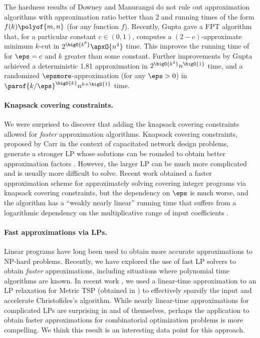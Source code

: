 \documentclass[11pt]{article}
\numberwithin{equation}{section}
\theoremstyle{definition}
\theoremstyle{plain}
\begin{document}
The hardness results of Downey \etal \cite{defpr-03} and Manurangsi
\cite{manurangsi-17} do not rule out approximation algorithms with
approximation ratio better than 2 and running times of the form
$f(k)\polyof{m,n}$ (for any function $f$). Recently, Gupta \etal \cite{gll-18} gave
a FPT algorithm that, for a particular constant $c \in (0,1)$,
computes a $(2 - c)$-approximate
minimum %
$k$-cut in
\begin{math}
  2^{\bigO{k^6}} \apxO{n^4}
\end{math}
time. This improves the running time of \cite{xcy-11} for $\eps = c$
and $k$ greater than some constant. Further improvements by
Gupta \etal \cite{gll-18-focs} achieved a deterministic 1.81 approximation in
$2^{\bigO{k^2}} n^{\bigO{1}}$ time, and a randomized
$\epsmore$-approximation (for any $\eps > 0$) in
$\parof{k / \eps}^{\bigO{k}} n^{k + \bigO{1}}$ time.

\paragraph{Knapsack covering constraints.}
We were surprised to discover that adding the knapsack covering
constraints allowed for \emph{faster} approximation
algorithms. Knapsack covering constraints, proposed by Carr \etal
\cite{cflp-00} in the context of capacitated network design problems,
generate a stronger LP whose solutions can be rounded to obtain better
approximation factors %
\cite{cflp-00,cckk-15,ky-05}.   %
However, the
larger LP can be much more complicated and is usually more difficult
to solve. Recent work obtained a faster approximation scheme for
%
approximately solving %
 covering integer programs via knapsack covering
constraints, but the dependency on $\eps$ is much worse, and the
algorithm has a ``weakly nearly linear'' running time that suffers
from a logarithmic dependency on the multiplicative range of input
coefficients \cite{cq-19}.

\paragraph{Fast approximations via LPs.}
Linear programs have long been used to obtain more accurate
approximations to %
NP-hard  %
problems. Recently, we have explored the use
of fast LP solvers to obtain \emph{faster} approximations, including
situations where polynomial time algorithms are known. In recent work
\cite{cq-18-christofides}, we used a %
linear-time  %
approximation to an
LP relaxation for Metric TSP (obtained in \cite{cq-17-focs}) to
effectively sparsify the input and accelerate
%
Christofides's
algorithm. While nearly %
linear-time  %
approximations for complicated
LPs are surprising in and of %
themselves, %
%
perhaps the application to
obtain faster approximations for combinatorial
optimization  %
problems is more
compelling. We think this result is %
%
%
an interesting %
data point for this approach.
\end{document}
